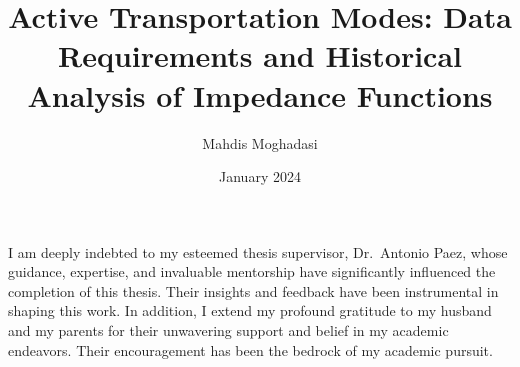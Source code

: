 \documentclass[12pt,twoside]{reedthesis}
\title{Active Transportation Modes: Data Requirements and Historical Analysis of Impedance Functions}
\author{Mahdis Moghadasi}
\date{January 2024}
\begin{document}
  \maketitle

\frontmatter %
\pagestyle{empty} %
  \begin{acknowledgements}
    I am deeply indebted to my esteemed thesis supervisor, Dr.~Antonio Paez, whose guidance, expertise, and invaluable mentorship have significantly influenced the completion of this thesis. Their insights and feedback have been instrumental in shaping this work. In addition, I extend my profound gratitude to my husband and my parents for their unwavering support and belief in my academic endeavors. Their encouragement has been the bedrock of my academic pursuit.
  \end{acknowledgements}


  \hypersetup{linkcolor=black}
  \setcounter{secnumdepth}{2}
  \setcounter{tocdepth}{2}
  \tableofcontents

  \listoftables
\end{document}
